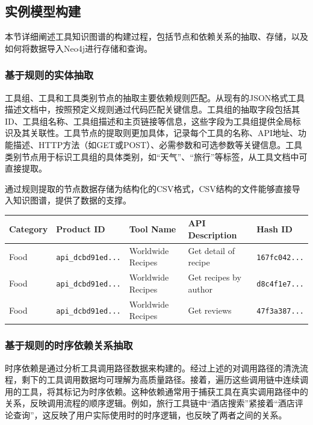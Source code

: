\subsection{实例模型构建}

本节详细阐述工具知识图谱的构建过程，包括节点和依赖关系的抽取、存储，以及如何将数据导入Neo4j进行存储和查询。

\subsubsection{基于规则的实体抽取}

工具组、工具和工具类别节点的抽取主要依赖规则匹配。从现有的JSON格式工具描述文档中，按照预定义规则通过代码匹配关键信息。工具组的抽取字段包括其ID、工具组名称、工具组描述和主页链接等信息，这些字段为工具组提供全局标识及其关联性。工具节点的提取则更加具体，记录每个工具的名称、API地址、功能描述、HTTP方法（如GET或POST）、必需参数和可选参数等关键信息。工具类别节点用于标识工具组的具体类别，如“天气”、“旅行”等标签，从工具文档中可直接提取。

通过规则提取的节点数据存储为结构化的CSV格式，CSV结构的文件能够直接导入知识图谱，提供了数据的支撑。

\begin{table}[ht]
\centering
{}
\label{tab:csv-example}
\renewcommand{\arraystretch}{1.2}
\scriptsize %
\begin{tabular}{|l|l|l|p{6cm}|l|}
\hline
\textbf{Category} & \textbf{Product ID} & \textbf{Tool Name} & \textbf{API Description} & \textbf{Hash ID} \\ \hline
Food & \texttt{api\_dcbd91ed...} & Worldwide Recipes & Get detail of recipe & \texttt{167fc042...} \\ \hline
Food & \texttt{api\_dcbd91ed...} & Worldwide Recipes & Get recipes by author & \texttt{d8c4f1e7...} \\ \hline
Food & \texttt{api\_dcbd91ed...} & Worldwide Recipes & Get reviews & \texttt{47f3a387...} \\ \hline
\end{tabular}
\end{table}

\subsubsection{基于规则的时序依赖关系抽取}

时序依赖是通过分析工具调用路径数据来构建的。经过上述的对调用路径的清洗流程，剩下的工具调用数据均可理解为高质量路径。接着，遍历这些调用链中连续调用的工具，将其标记为时序依赖。这种依赖通常用于捕获工具在真实调用路径中的关系，反映调用流程的顺序逻辑。例如，旅行工具链中“酒店搜索”紧接着“酒店评论查询”，这反映了用户实际使用时的时序逻辑，也反映了两者之间的关系。

